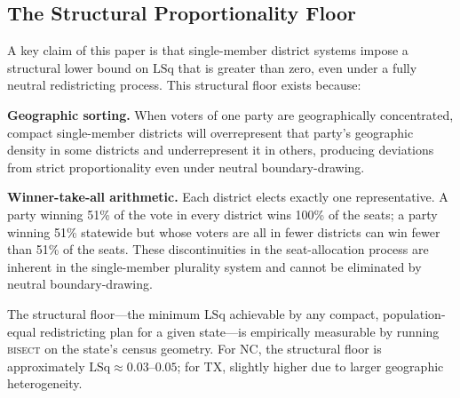 \subsection{The Structural Proportionality Floor}

A key claim of this paper is that single-member district systems impose a structural
lower bound on $\text{LSq}$ that is greater than zero, even under a fully neutral
redistricting process. This structural floor exists because:

\textbf{Geographic sorting.} When voters of one party are geographically concentrated,
compact single-member districts will overrepresent that party's geographic density
in some districts and underrepresent it in others, producing deviations from strict
proportionality even under neutral boundary-drawing.

\textbf{Winner-take-all arithmetic.} Each district elects exactly one representative.
A party winning 51\% of the vote in every district wins 100\% of the seats;
a party winning 51\% statewide but whose voters are all in fewer districts
can win fewer than 51\% of the seats. These discontinuities in the seat-allocation
process are inherent in the single-member plurality system and cannot be eliminated
by neutral boundary-drawing.

The structural floor---the minimum $\text{LSq}$ achievable by any compact,
population-equal redistricting plan for a given state---is empirically measurable
by running \textsc{bisect} on the state's census geometry. For NC, the structural
floor is approximately $\text{LSq} \approx 0.03$--$0.05$; for TX, slightly higher
due to larger geographic heterogeneity.
